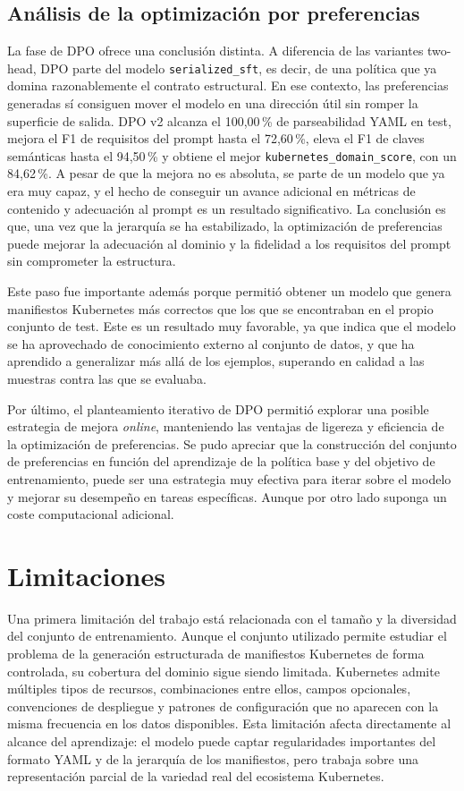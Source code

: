 \subsection{Análisis de la optimización por preferencias}

La fase de DPO ofrece una conclusión distinta. A diferencia de las variantes two-head, DPO
parte del modelo \texttt{serialized\_sft}, es decir, de una política que ya domina
razonablemente el contrato estructural. En ese contexto, las preferencias generadas sí
consiguen mover el modelo en una dirección útil sin romper la superficie de salida. DPO v2
alcanza el 100{,}00\,\% de parseabilidad YAML en test, mejora el F1 de requisitos del
prompt hasta el 72{,}60\,\%, eleva el F1 de claves semánticas hasta el 94{,}50\,\% y
obtiene el mejor \texttt{kubernetes\_domain\_score}, con un 84{,}62\,\%. A pesar de que la
mejora no es absoluta, se parte de un modelo que ya era muy capaz, y el hecho de conseguir
un avance adicional en métricas de contenido y adecuación al prompt es un resultado
significativo. La conclusión es que, una vez que la jerarquía se ha estabilizado, la optimización
de preferencias puede mejorar la adecuación al dominio y la fidelidad a los requisitos del
prompt sin comprometer la estructura.

Este paso fue importante además porque permitió obtener un modelo que genera manifiestos Kubernetes
más correctos que los que se encontraban en el propio conjunto de test. Este es un resultado
muy favorable, ya que indica que el modelo se ha aprovechado de conocimiento externo
al conjunto de datos, y que ha aprendido a generalizar más allá de los ejemplos, superando en calidad a las
muestras contra las que se evaluaba.

Por último, el planteamiento iterativo de DPO permitió explorar una posible estrategia de mejora \textit{online},
manteniendo las ventajas de ligereza y eficiencia de la optimización de preferencias. Se pudo apreciar que
la construcción del conjunto de preferencias en función del aprendizaje de la política base y del objetivo de
entrenamiento, puede ser una estrategia muy efectiva para iterar sobre el modelo y mejorar su desempeño en 
tareas específicas. Aunque por otro lado suponga un coste computacional adicional.

\section{Limitaciones}
Una primera limitación del trabajo está relacionada con el tamaño y la diversidad del conjunto de entrenamiento.
Aunque el conjunto utilizado permite estudiar el problema de la generación estructurada de manifiestos Kubernetes de
forma controlada, su cobertura del dominio sigue siendo limitada. Kubernetes admite múltiples tipos de recursos,
combinaciones entre ellos, campos opcionales, convenciones de despliegue y patrones de configuración que no aparecen
con la misma frecuencia en los datos disponibles. Esta limitación afecta directamente al alcance del aprendizaje: el
modelo puede captar regularidades importantes del formato YAML y de la jerarquía de los manifiestos, pero trabaja sobre
una representación parcial de la variedad real del ecosistema Kubernetes.

